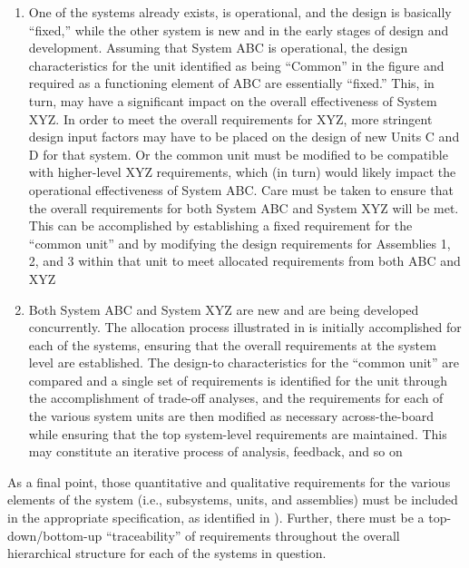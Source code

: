 \begin{enumerate}
\item One of the systems already exists, is operational, and the design is basically ``fixed,'' while the other system is new and in the early stages of design and development. Assuming that System ABC is operational, the design characteristics for the unit identified as being ``Common'' in the figure and required as a functioning element of ABC are essentially ``fixed.'' This, in turn, may have a significant impact on the overall effectiveness of System XYZ. In order to meet the overall requirements for XYZ, more stringent design input factors may have to be placed on the design of new Units C and D for that system. Or the common unit must be modified to be compatible with higher-level XYZ requirements, which (in turn) would likely impact the operational effectiveness of System ABC. Care must be taken to ensure that the overall requirements for both System ABC and System XYZ will be met. This can be accomplished by establishing a fixed requirement for the ``common unit'' and by modifying the design requirements for Assemblies 1, 2, and 3 within that unit to meet allocated requirements from both ABC and XYZ
\item Both System ABC and System XYZ are new and are being developed concurrently. The allocation process illustrated in is initially accomplished for each of the systems, ensuring that the overall requirements at the system level are established. The design-to characteristics for the ``common unit'' are compared and a single set of requirements is identified for the unit through the accomplishment of trade-off analyses, and the requirements for each of the various system units are then modified as necessary across-the-board while ensuring that the top system-level requirements are maintained. This may constitute an iterative process of analysis, feedback, and so on
\end{enumerate}

As a final point, those quantitative and qualitative requirements for the various elements of the system (i.e., subsystems, units, and assemblies) must be included in the appropriate specification, as identified in ). Further, there must be a top-down/bottom-up ``traceability'' of requirements throughout the overall hierarchical structure for each of the systems in question.

